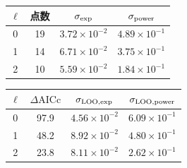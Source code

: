 \documentclass[UTF8,fontset=fandol,11pt,a4paper,oneside]{ctexart}
\numberwithin{equation}{section}
\begin{document}
\noindent\begin{minipage}{\linewidth}
\captionsetup{type=table}\caption{指数模型、幂律模型及固定热斜率的比较。}\label{audit:tab:tail-models}
\centering\fontsize{10}{13.5}\selectfont
\setlength{\tabcolsep}{6pt}\renewcommand{\arraystretch}{1.2}
\par{}\par\smallskip
\begin{tabular}{cccc}\toprule
$\ell$ & 点数 & $\sigma_{\rm exp}$ & $\sigma_{\rm power}$\\\midrule
0 & 19 & $3.72\times10^{-2}$ & $4.89\times10^{-1}$\\
1 & 14 & $6.71\times10^{-2}$ & $3.75\times10^{-1}$\\
2 & 10 & $5.59\times10^{-2}$ & $1.84\times10^{-1}$\\
\bottomrule\end{tabular}
\par\medskip
\par{}\par\smallskip
\begin{tabular}{cccc}\toprule
$\ell$ & $\Delta\mathrm{AICc}$ & $\sigma_{\rm LOO,exp}$ & $\sigma_{\rm LOO,power}$\\\midrule
0 & 97.9 & $4.56\times10^{-2}$ & $6.09\times10^{-1}$\\
1 & 48.2 & $8.92\times10^{-2}$ & $4.80\times10^{-1}$\\
2 & 23.8 & $8.11\times10^{-2}$ & $2.62\times10^{-1}$\\
\bottomrule\end{tabular}
\end{minipage}\par\addvspace{10pt}
\par\addvspace{14pt}
\end{document}

